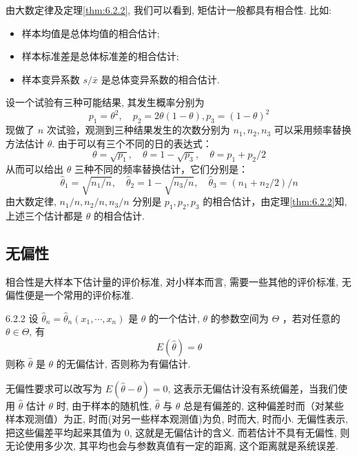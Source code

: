 由大数定律及定理\ref{thm:6.2.2}, 我们可以看到, 矩估计一般都具有相合性. 比如:
\begin{itemize}
\item 样本均值是总体均值的相合估计;
\item 样本标准差是总体标准差的相合估计;
\item 样本变异系数 $s/\bar x$ 是总体变异系数的相合估计.
\end{itemize}

\begin{example}\label{exam:6.2.3}
设一个试验有三种可能结果, 其发生概率分别为
\[p_{1}=\theta^{2}, \quad p_{2}=2 \theta(1-\theta), p_{3}=(1-\theta)^{2}\]
现做了 $n$ 次试验，观测到三种结果发生的次数分别为 $n_1,n_2,n_3$ 可以采用频率替换方法估计 $\theta$. 由于可以有三个不同的日的表达式：
\[\theta=\sqrt{p_{1}}, \quad \theta=1-\sqrt{p_{3}}, \quad \theta=p_{1}+p_{2} / 2\]
从而可以给出 $\theta$ 三种不同的频率替换估计，它们分别是：
\[\hat{\theta}_{1}=\sqrt{n_{1} / n}, \quad \hat{\theta}_{2}=1-\sqrt{n_{3} / n}, \quad \hat{\theta}_{3}=\left(n_{1}+n_{2} / 2\right) / n\]
由大数定律, $n_1/n,n_2/n,n_3/n$ 分别是 $p_1,p_2,p_3$ 的相合估计，由定理\ref{thm:6.2.2}知, 上述三个估计都是 $\theta$ 的相合估计.
\end{example}

\subsection{无偏性}\label{ssec:6.2.2} %

相合性是大样本下估计量的评价标准, 对小样本而言, 需要一些其他的评价标准, 无偏性便是一个常用的评价标准.

\begin{definition}{}{6.2.2} %
设 $\hat{\theta}_n=\hat{\theta}_n(x_1,\cdots,x_n)$ 是 $\theta$ 的一个估计, $\theta$ 的参数空间为 $\Theta$ ，若对任意的 $\theta\in\Theta$, 有
\begin{equation}\label{eq:6.2.4}
E(\hat{\theta})=\theta
\end{equation}
则称 $\hat\theta$ 是 $\theta$ 的{\heiti 无偏估计}, 否则称为{\heiti 有偏估计}.
\end{definition}

无偏性要求可以改写为 $E(\hat{\theta}-\theta)=0$, 这表示无偏估计没有系统偏差，当我们使用 $\hat{\theta}$ 估计 $\theta$ 时, 由于样本的随机性, $\hat{\theta}$ 与 $\theta$ 总是有偏差的, 这种偏差时而（对某些样本观测值）为正, 时而(对另一些样本观测值)为负, 时而大, 时而小. 无偏性表示, 把这些偏差平均起来其值为 0, 这就是无偏估计的含义. 而若估计不具有无偏性, 则无论使用多少次, 其平均也会与参数真值有一定的距离, 这个距离就是系统误差.

